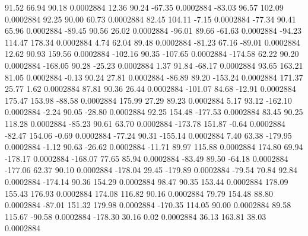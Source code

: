        91.52       66.94       90.18     0.0002884
       12.36       90.24      -67.35     0.0002884
      -83.03       96.57      102.09     0.0002884
       92.25       90.00       60.73     0.0002884
       82.45      104.11       -7.15     0.0002884
      -77.34       90.41       65.96     0.0002884
      -89.45       90.56       26.02     0.0002884
      -96.01       89.66      -61.63     0.0002884
      -94.23      114.47      178.34     0.0002884
        4.74       62.04       89.48     0.0002884
      -81.23       67.16      -89.01     0.0002884
       12.62       90.93      159.56     0.0002884
     -102.16       90.35     -107.65     0.0002884
     -174.58       62.22       90.20     0.0002884
     -168.05       90.28      -25.23     0.0002884
        1.37       91.84      -68.17     0.0002884
       93.65      163.21       81.05     0.0002884
       -0.13       90.24       27.81     0.0002884
      -86.89       89.20     -153.24     0.0002884
      171.37       25.77        1.62     0.0002884
       87.81       90.36       26.44     0.0002884
     -101.07       84.68      -12.91     0.0002884
      175.47      153.98      -88.58     0.0002884
      175.99       27.29       89.23     0.0002884
        5.17       93.12     -162.10     0.0002884
       -2.24       90.05      -28.80     0.0002884
       92.25      154.48     -177.53     0.0002884
       83.45       90.25      118.28     0.0002884
      -85.23       90.61       63.70     0.0002884
     -173.78      151.87       -0.64     0.0002884
      -82.47      154.06       -0.69     0.0002884
      -77.24       90.31     -155.14     0.0002884
        7.40       63.38     -179.95     0.0002884
       -1.12       90.63      -26.62     0.0002884
      -11.71       89.97      115.88     0.0002884
      174.80       69.94     -178.17     0.0002884
     -168.07       77.65       85.94     0.0002884
      -83.49       89.50      -64.18     0.0002884
     -177.06       62.37       90.10     0.0002884
     -178.04       29.45     -179.89     0.0002884
      -79.54       70.84       92.84     0.0002884
     -174.14       90.36      154.29     0.0002884
       98.47       90.35      153.44     0.0002884
      178.09      155.43      176.93     0.0002884
      174.08      116.82       90.16     0.0002884
       79.79      154.48       88.80     0.0002884
      -87.01      151.32      179.98     0.0002884
     -170.35      114.05       90.00     0.0002884
       89.58      115.67      -90.58     0.0002884
     -178.30       30.16        0.02     0.0002884
       36.13      163.81       38.03     0.0002884
